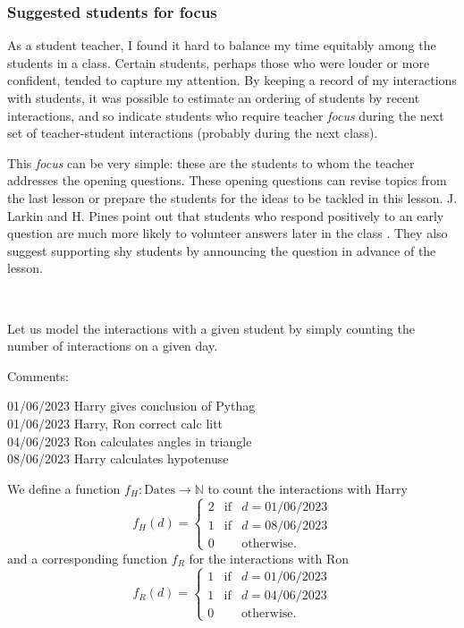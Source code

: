\documentclass[10pt]{article}
\begin{document}
\subsubsection{Suggested students for focus} \label{output_focus}

As a student teacher, I found it hard to balance my time equitably among the students in a class. Certain students, perhaps those who were louder or more confident, tended to capture my attention. By keeping a record of my interactions with students, it was possible to estimate an ordering of students by recent interactions, and so indicate students who require teacher \emph{focus} during the next set of teacher-student interactions (probably during the next class).

This \emph{focus} can be very simple: these are the students to whom the teacher addresses the opening questions. These opening questions can revise topics from the last lesson or prepare the students for the ideas to be tackled in this lesson. J. Larkin and H. Pines point out that students who respond positively to an early question are much more likely to volunteer answers later in the class \cite{Larkin05}. They also suggest supporting shy students by announcing the question in advance of the lesson.

\

Let us model the interactions with a given student by simply counting the number of interactions on a given day.

\begin{tcolorbox}
Comments:

01/06/2023 Harry gives conclusion of Pythag \\
01/06/2023 Harry, Ron correct calc litt \\
04/06/2023 Ron calculates angles in triangle \\
08/06/2023 Harry calculates hypotenuse
\end{tcolorbox}
We define a function $f_H : \mbox{Dates} \to \mathbb{N}$ to count the interactions with Harry
$$ f_{H}(d) = \left\{ \begin{matrix} 2 &  \mbox{if} & d=\mbox{01/06/2023} \\ 1 & \mbox{if} & d=\mbox{08/06/2023}  \\ 0 && \mbox{otherwise.} \end{matrix} \right. $$
and a corresponding function $f_R$ for the interactions with Ron
$$ f_{R}(d) = \left\{ \begin{matrix} 1 &  \mbox{if} & d=\mbox{01/06/2023}  \\ 1 &  \mbox{if} & d=\mbox{04/06/2023}  \\  0 && \mbox{otherwise.} \end{matrix} \right. $$
\end{document}
